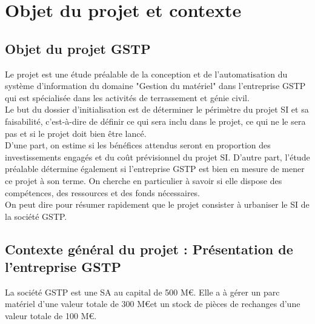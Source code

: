 \documentclass[12pt]{article}
\begin{document}
\maketitle


\section{Objet du projet et contexte}

\subsection{Objet du projet GSTP}
Le projet est une étude préalable de la conception et de l'automatisation
du système d'information du domaine "Gestion du matériel" dans l'entreprise 
GSTP qui est spécialisée dans les activités de terrassement et génie civil.\\

Le but du dossier d'initialisation est de déterminer le périmètre du projet
SI et sa faisabilité, c’est-à-dire de définir ce qui sera inclu
dans le projet, ce qui ne le sera pas et si le projet doit bien être
lancé.\\

D’une part, on estime si les bénéfices attendus seront en proportion des
investissements engagés et du coût prévisionnel du projet SI.  D’autre
part, l’étude préalable détermine également si l’entreprise GSTP est
bien en mesure de mener ce projet à son terme. On cherche en particulier
à savoir si elle dispose des compétences, des ressources et des fonds
nécessaires.\\

On peut dire pour résumer rapidement que le projet consister à urbaniser le
SI de la société GSTP.


\subsection{Contexte général du projet : Présentation de l'entreprise GSTP}

La société GSTP est une SA au capital de 500 M\euro. Elle a à gérer un parc
matériel d'une valeur totale de 300 M\euro et un stock de pièces de
rechanges d'une valeur totale de 100 M\euro.
\end{document}
